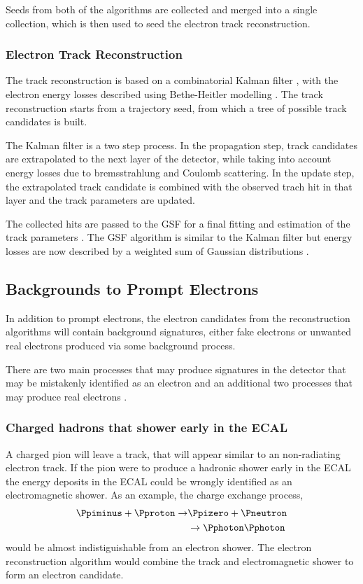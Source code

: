 Seeds from both of the algorithms are collected and merged into a single
collection, which is then used to seed the electron track reconstruction.

\subsubsection{Electron Track Reconstruction}
The track reconstruction is based on a combinatorial Kalman filter \cite{kalman},
with the electron energy losses described using Bethe-Heitler
modelling \cite{bethe}.
The track reconstruction starts from a trajectory seed, from which a tree of
possible track candidates is built. 

The Kalman filter is a two step process. In the propagation step, track
candidates are extrapolated to the next layer of the detector, while taking into
 account energy losses due to bremsstrahlung and Coulomb scattering.  In
the update step, the extrapolated track candidate is combined with the observed
trach hit in that layer and the track parameters are updated. 

The collected hits are passed to the \ac{GSF} for a final fitting and estimation
of the track parameters \cite{cmsgsf}. The \ac{GSF} algorithm is similar to the
Kalman filter but energy losses are now described by a weighted sum of Gaussian
distributions \cite{gsf}.

\subsection{Backgrounds to Prompt Electrons}
In addition to prompt electrons, the electron candidates from the reconstruction
algorithms will contain background signatures, either fake electrons or unwanted
real electrons produced via some background process.

There are two main processes that may produce signatures in the detector that
may be mistakenly identified as an electron and an additional
two processes that may produce real electrons \cite{nikos}.

\subsubsection{Charged hadrons that shower early in the ECAL}
A charged pion will leave a track, that will appear similar to an non-radiating
electron track.
If the pion were to produce a hadronic shower early in the ECAL
the energy deposits in the ECAL could be wrongly identified as an
electromagnetic shower.
As an example, the charge exchange process,
\begin{align}
\Ppiminus + \Pproton \to &\Ppizero + \Pneutron \nonumber \\
                         &\to \Pphoton\Pphoton
\end{align}
would be almost indistiguishable from an electron shower.
The electron reconstruction algorithm would combine the
track and electromagnetic shower to form an electron candidate.


